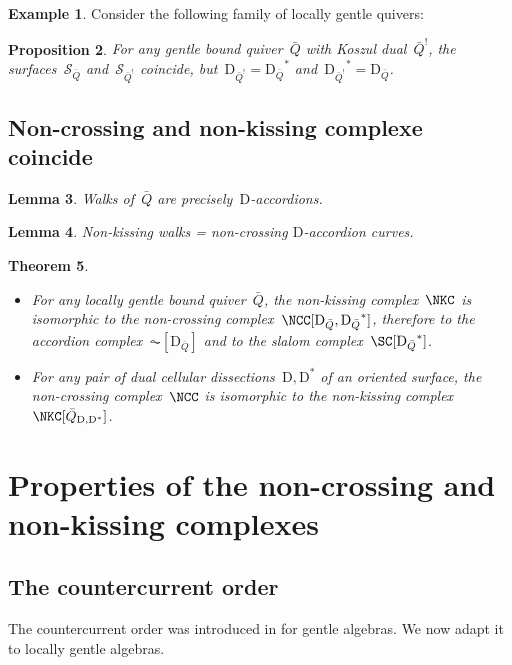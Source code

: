 \documentclass{amsart}
\newtheorem{theorem}{Theorem}[]
\newtheorem{proposition}[theorem]{Proposition}
\newtheorem{lemma}[theorem]{Lemma}
\theoremstyle{definition}
\newtheorem{example}[theorem]{Example}
\newcommand{\vincent}[1]{\todo[color=blue!30]{#1 \\ \hfill --- V.}}
\newcommand{\surface}{\mathcal{S}} %
\newcommand{\dual}{^*} %
\newcommand{\dissection}{\mathrm{D}} %
\newcommand{\koszul}{^!} %
\begin{document}
\begin{example}
Consider the following family of locally gentle quivers:
\vincent{TODO}
\end{example}

\begin{proposition}
\label{prop:dualityKoszul2}
For any gentle bound quiver~$\bar Q$ with Koszul dual~$\bar Q\koszul$, the surfaces~$\surface_{\bar Q}$ and~$\surface_{\bar Q\koszul}$ coincide, but~$\dissection_{\bar Q\koszul} = {\dissection_{\bar Q}}\dual$ and~${\dissection_{\bar Q\koszul}}\dual = \dissection_{\bar Q}$.
\end{proposition}

\subsection{Non-crossing and non-kissing complexe coincide}

\begin{lemma}
\label{lem:walks=arcs}
Walks of~$\bar Q$ are precisely~$\dissection$-accordions.
\end{lemma}

\begin{lemma}
\label{lem:nonKissing=nonCrossing}
Non-kissing walks = non-crossing $\dissection$-accordion curves.
\end{lemma}

\begin{theorem}
\label{thm:complexesCoincide}
\begin{itemize}
\item For any locally gentle bound quiver~$\bar Q$, the non-kissing complex~$\NKC$ is isomorphic to the non-crossing complex~$\NCC[\dissection_{\bar Q}, {\dissection_{\bar Q}}\dual]$, therefore to the accordion complex~$\AC[\dissection_{\bar Q}]$ and to the slalom complex~$\SC[{\dissection_{\bar Q}}\dual]$.
\item For any pair of dual cellular dissections~$\dissection, \dissection\dual$ of an oriented surface, the non-crossing complex~$\NCC$ is isomorphic to the non-kissing complex~$\NKC[\bar Q_{\dissection, \dissection\dual}]$.
\end{itemize}
\end{theorem}


\section{Properties of the non-crossing and non-kissing complexes}

\subsection{The countercurrent order}
The countercurrent order was introduced in \cite{PaluPilaudPlamondon} for gentle algebras.  We now adapt it to locally gentle algebras.
\end{document}
